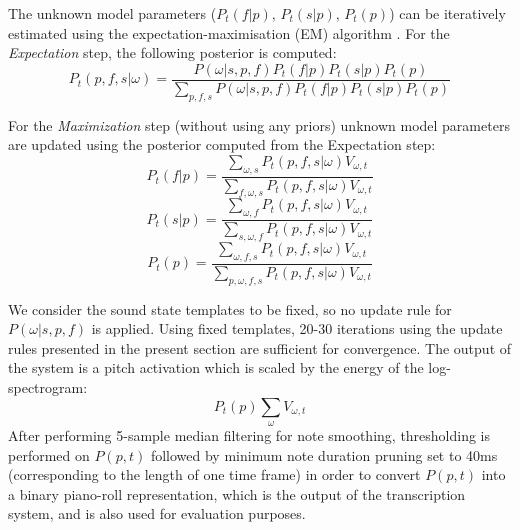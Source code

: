 The unknown model parameters ($P_{t}(f|p)$, $P_{t}(s|p)$, $P_{t}(p)$) can be iteratively estimated using the expectation-maximisation (EM) algorithm \cite{Dempster77}. For the \emph{Expectation} step, the following posterior is computed:
 \begin{equation}
  P_{t}(p,f,s|\omega) = \frac{P(\omega|s,p,f)P_{t}(f|p)P_{t}(s|p)P_{t}(p)}{\sum_{p,f,s}P(\omega|s,p,f)P_{t}(f|p)P_{t}(s|p)P_{t}(p)} \label{eq:EStep}
 \end{equation}
  
For the \emph{Maximization} step (without using any priors) unknown model parameters are updated using the posterior computed from the Expectation step:
 \begin{equation}
 P_{t}(f|p) = \frac{\sum_{\omega,s}P_{t}(p,f,s|\omega)V_{\omega,t}}{\sum_{f,\omega,s}P_{t}(p,f,s|\omega)V_{\omega,t}} 
\end{equation}
\begin{equation}
 P_{t}(s|p) = \frac{\sum_{\omega,f}P_{t}(p,f,s|\omega)V_{\omega,t}}{\sum_{s,\omega,f}P_{t}(p,f,s|\omega)V_{\omega,t}} \label{eq:MStepInstrument}
\end{equation}
\begin{equation}
 P_{t}(p) = \frac{\sum_{\omega,f,s}P_{t}(p,f,s|\omega)V_{\omega,t}}{\sum_{p,\omega,f,s}P_{t}(p,f,s|\omega)V_{\omega,t}} \label{eq:MStepTranscription}
\end{equation}


We consider the sound state templates to be fixed, so no update rule for $P(\omega|s,p,f)$ is applied. Using fixed templates, 20-30 iterations using the update rules presented in the present section are sufficient for convergence. The output of the system is a pitch activation which is scaled by the energy of the log-spectrogram:
\begin{equation}
 P_{t}(p)\sum_{\omega}V_{\omega,t} \label{eq:transcription}
\end{equation}
After performing 5-sample median filtering for note smoothing, thresholding is performed on $P(p,t)$ followed by minimum note duration pruning set to 40ms (corresponding to the length of one time frame) in order to convert $P(p,t)$ into a binary piano-roll representation, which is the output of the transcription system, and is also used for evaluation purposes. 